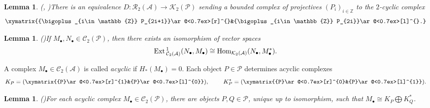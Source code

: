 \documentclass[reqno,12pt]{amsart}
\numberwithin{equation}{section}
\def\Ext{\mbox{\rm Ext}\,} \def\Hom{\mbox{\rm Hom}} \def\dim{\mbox{\rm dim}\,} \def\Iso{\mbox{\rm Iso}\,}
\theoremstyle{plain} %
\newtheorem{lemma}[theorem]{\bf Lemma}
\theoremstyle{definition} %
\begin{document}
\begin{lemma}{\rm(\cite{PX97}, \cite[Lemma 3.1]{Br})}\label{fully faithful}
There is an equivalence $D : \mathcal{R}_2(\mathcal{A})\rightarrow {\mathcal {K}}_2(\mathscr{P})$ sending a bounded complex of projectives $(P_i)_{i \in \mathbb{Z}}$ to the $2$-cyclic complex
$$\xymatrix{{\bigoplus_{i\in\mathbb{Z}} P_{2i+1}}\ar@<0.7ex>[r]^{}&{\bigoplus_{i\in\mathbb{Z}} P_{2i}}\ar@<0.7ex>[l]^{}.}$$
\end{lemma}

\begin{lemma}{\rm(\cite[Lemma 3.3]{Br})}\label{Ext to Hom}
If $M_\bullet,N_\bullet \in \mathcal{C}_2(\mathscr{P})$, then there exists an isomorphism of vector spaces $$\Ext_{\mathcal{C}_2(\mathcal{A})}^1(N_\bullet,M_\bullet) \cong \Hom_{{\mathcal {K}}_2(\mathcal{A})}(N_\bullet,M_\bullet^\ast).$$
\end{lemma}

A complex $M_\bullet \in \mathcal{C}_2(\mathcal{A})$ is called \emph{acyclic} if $H_\ast(M_\bullet)=0$. Each object $P \in \mathscr{P}$ determines acyclic complexes
\[{K_P} = (\xymatrix{{P}\ar@<0.7ex>[r]^{1}&{P}\ar@<0.7ex>[l]^{0}}),  ~~~~~~~K_P^* = (\xymatrix{{P}\ar@<0.7ex>[r]^{0}&{P}\ar@<0.7ex>[l]^{1}}).\]

\begin{lemma}{\rm(\cite[Lemma 3.2]{Br})}\label{zero}
For each acyclic complex $M_\bullet \in \mathcal{C}_2(\mathscr{P})$, there are objects $P,Q \in \mathscr{P}$, unique up to isomorphism, such that $M_\bullet \cong K_P \bigoplus K_Q^*$.
\end{lemma}
\end{document}
